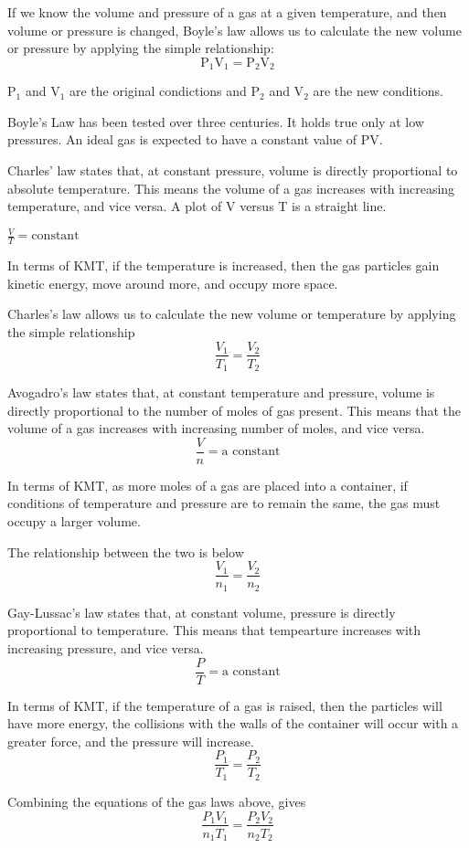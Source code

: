 \documentclass[../chem.tex]{subfiles}
\begin{document}
If we know the volume and pressure of a gas at a given temperature, and then volume or pressure is changed, Boyle's law allows us to calculate the new volume or pressure by applying the simple relationship:
\[\text{P}_1\text{V}_1=\text{P}_2\text{V}_2\] 

P$_1$ and V$_1$ are the original condictions and P$_2$ and V$_2$ are the new conditions.

Boyle's Law has been tested over three centuries. It holds true only at low pressures. An ideal gas is expected to have a constant value of PV.

Charles' law states that, at constant pressure, volume is directly proportional to absolute temperature. This means the volume of a gas increases with increasing temperature, and vice versa.
A plot of V versus T is a straight line.

$\frac{V}{T} = \text{constant}$

In terms of KMT, if the temperature is increased, then the gas particles gain kinetic energy, move around more, and occupy more space.

Charles's law allows us to calculate the new volume or temperature by applying the simple relationship 
\[\frac{V_1}{T_1}=\frac{V_2}{T_2}\]

Avogadro's law states that, at constant temperature and pressure, volume is directly proportional to the number of moles of gas present. This means that the volume of a gas increases 
with increasing number of moles, and vice versa. 
\[\frac{V}{n}=\text{a constant}\]

In terms of KMT, as more moles of a gas are placed into a container, if conditions of temperature and pressure are to remain the same, the gas must occupy a larger volume.

The relationship between the two is below 
\[\frac{V_1}{n_1}=\frac{V_2}{n_2}\]

Gay-Lussac's law states that, at constant volume, pressure is directly proportional to temperature. This means that tempearture increases with increasing pressure, and vice versa.
\[\frac{P}{T}=\text{a constant}\]

In terms of KMT, if the temperature of a gas is raised, then the particles will have more energy, the collisions with the walls of the container will occur with a greater force, and the pressure will increase.
\[\frac{P_1}{T_1}=\frac{P_2}{T_2}\]

Combining the equations of the gas laws above, gives 
\[\frac{P_1V_1}{n_1T_1}=\frac{P_2V_2}{n_2T_2}\]
\end{document}
